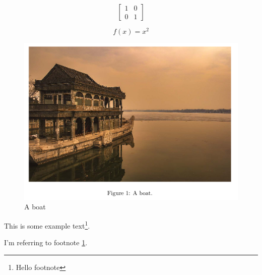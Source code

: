 \documentclass{article}
\begin{document}
\begin{equation*}
  \left[
  \begin{matrix}
  1 & 0\\
  0 & 1
  \end{matrix}
  \right]
\end{equation*}

\begin{equation}
  f(x) = x^2
\end{equation}

\begin{figure}[h!]
  \includegraphics[width=\linewidth]{boat.png}
  \caption{A boat}
  \label{figure:boat1}
\end{figure}

This is some example text\footnote{\label{myfootnote}Hello footnote}.


I'm referring to footnote \ref{myfootnote}.
\end{document}
